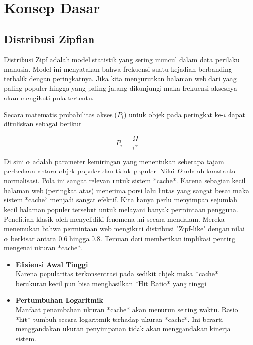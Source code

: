 \section{Konsep Dasar}
\label{sec:konsep_dasar}
\subsection{Distribusi Zipfian}

Distribusi Zipf adalah model statistik yang sering muncul dalam data
perilaku manusia. Model ini menyatakan bahwa frekuensi suatu kejadian
berbanding terbalik dengan peringkatnya. Jika kita mengurutkan
halaman web dari yang paling populer hingga yang paling jarang
dikunjungi maka frekuensi aksesnya akan mengikuti pola tertentu.

Secara matematis probabilitas akses ($P_i$) untuk objek pada
peringkat ke-$i$ dapat dituliskan sebagai berikut

\begin{equation}
  P_i = \frac{\Omega}{i^\alpha}
\end{equation}

Di sini $\alpha$ adalah parameter kemiringan yang menentukan seberapa
tajam perbedaan antara objek populer dan tidak populer. Nilai
$\Omega$ adalah konstanta normalisasi.
Pola ini sangat relevan untuk sistem *cache*. Karena sebagian kecil
halaman web (peringkat atas) menerima porsi lalu lintas yang sangat
besar maka sistem *cache* menjadi sangat efektif. Kita hanya perlu
menyimpan sejumlah kecil halaman populer tersebut untuk melayani
banyak permintaan pengguna.
Penelitian klasik oleh \cite{Breslau1999Web} menyelidiki fenomena
ini secara mendalam. Mereka menemukan bahwa permintaan web mengikuti
distribusi "Zipf-like" dengan nilai $\alpha$ berkisar antara 0.6 hingga 0.8.
Temuan dari \cite{Breslau1999Web} memberikan implikasi penting
mengenai ukuran *cache*.

\begin{itemize}
  \item \textbf{Efisiensi Awal Tinggi} \\
    Karena popularitas terkonsentrasi pada sedikit objek maka *cache*
    berukuran kecil pun bisa menghasilkan *Hit Ratio* yang tinggi.

  \item \textbf{Pertumbuhan Logaritmik} \\
    Manfaat penambahan ukuran *cache* akan menurun seiring waktu.
    Rasio *hit* tumbuh secara logaritmik terhadap ukuran *cache*. Ini
    berarti menggandakan ukuran penyimpanan tidak akan menggandakan
    kinerja sistem.
\end{itemize}

